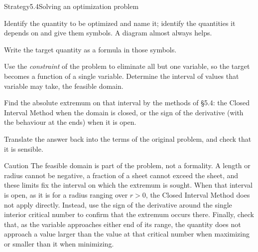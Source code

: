 \documentclass[a4paper,12pt,oneside]{memoir}
\begin{document}
\begin{envstrategy}{Strategy}{5.4}{Solving an optimization problem}
\begin{steps}
  \item Identify the quantity to be optimized and name it; identify the quantities it depends on and give them symbols. A diagram almost always helps.
  \item Write the target quantity as a formula in those symbols.
  \item Use the \emph{constraint} of the problem to eliminate all but one variable, so the target becomes a function of a single variable. Determine the interval of values that variable may take, the feasible domain.
  \item Find the absolute extremum on that interval by the methods of §5.4: the Closed Interval Method when the domain is closed, or the sign of the derivative (with the behaviour at the ends) when it is open.
  \item Translate the answer back into the terms of the original problem, and check that it is sensible.
\end{steps}
\end{envstrategy}
\begin{envcaution}{Caution}{}{}
The feasible domain is part of the problem, not a formality. A length or radius cannot be negative, a fraction of a sheet cannot exceed the sheet, and these limits fix the interval on which the extremum is sought. When that interval is open, as it is for a radius ranging over \(r > 0\), the Closed Interval Method does not apply directly. Instead, use the sign of the derivative around the single interior critical number to confirm that the extremum occurs there. Finally, check that, as the variable approaches either end of its range, the quantity does not approach a value larger than the value at that critical number when maximizing or smaller than it when minimizing.
\end{envcaution}
\end{document}
